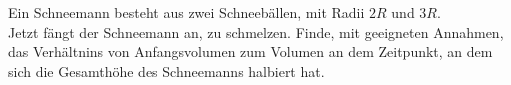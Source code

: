 \begin{Exercise}[label = frosty, origin = {STEP 1991, 1. Paper}, title = {Schneemann}, difficulty = 2]
	Ein Schneemann besteht aus zwei Schneebällen, mit Radii $2R$ und $3R$.\\
	Jetzt fängt der Schneemann an, zu schmelzen. Finde, mit geeigneten Annahmen, das Verhältnins von Anfangsvolumen zum Volumen an dem Zeitpunkt, an dem sich die Gesamthöhe des Schneemanns halbiert hat.
\end{Exercise}